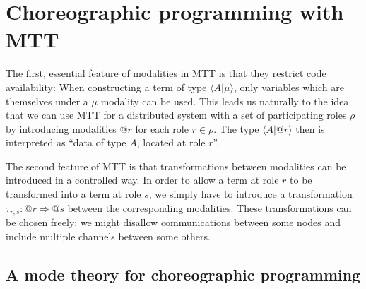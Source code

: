 \documentclass{scrartcl}
\theoremstyle{definition}
\theoremstyle{plain}
\begin{document}
\section{Choreographic programming with MTT}
The first, essential feature of modalities in MTT is that they restrict code availability:
When constructing a term of type $\langle A | \mu \rangle$, only
variables which are themselves under a $\mu$ modality can be used. This leads
us naturally to the idea that we can use MTT for a distributed system with a set of
participating roles $\rho$ by introducing modalities $@ r$ for each role $r \in
\rho$. The type $\langle A | @ r \rangle$ then is interpreted as ``data of type
$A$, located at role $r$''.

\medskip

The second feature of MTT is that transformations between
modalities can be introduced in a controlled way. In order to allow a term at
role $r$ to be transformed into a term at role $s$, we simply have to introduce
a transformation $\tau_{r,s} : @r \Rightarrow @s$ between the corresponding
modalities. These transformations can be chosen freely: we might disallow
communications between some nodes and include multiple channels between some others.

\subsection{A mode theory for choreographic programming}
\end{document}
